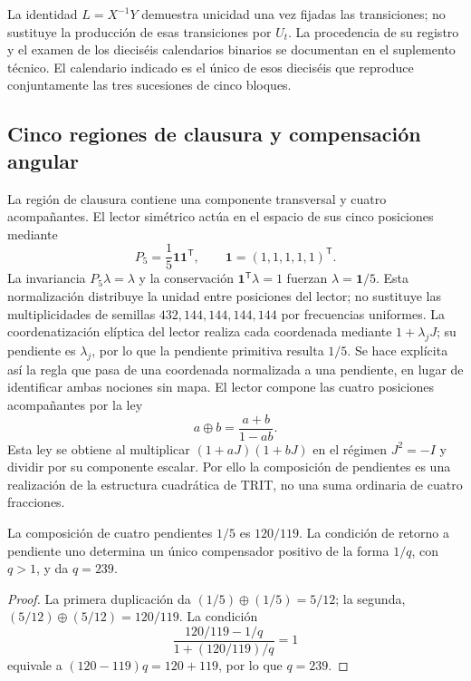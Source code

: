 La identidad \(L=X^{-1}Y\) demuestra unicidad una vez fijadas las transiciones; no sustituye la producción de esas transiciones por \(U_t\). La procedencia de su registro y el examen de los dieciséis calendarios binarios se documentan en el suplemento técnico. El calendario indicado es el único de esos dieciséis que reproduce conjuntamente las tres sucesiones de cinco bloques.

\subsection{Cinco regiones de clausura y compensación angular}

La región de clausura contiene una componente transversal y cuatro acompañantes. El lector simétrico actúa en el espacio de sus cinco posiciones mediante
\[
 P_5=\frac15\mathbf1\mathbf1^{\mathsf T},\qquad
 \mathbf1=(1,1,1,1,1)^{\mathsf T}.
\]
La invariancia \(P_5\lambda=\lambda\) y la conservación \(\mathbf1^{\mathsf T}\lambda=1\) fuerzan \(\lambda=\mathbf1/5\). Esta normalización distribuye la unidad entre posiciones del lector; no sustituye las multiplicidades de semillas \(432,144,144,144,144\) por frecuencias uniformes. La coordenatización elíptica del lector realiza cada coordenada mediante \(1+\lambda_jJ\); su pendiente es \(\lambda_j\), por lo que la pendiente primitiva resulta \(1/5\). Se hace explícita así la regla que pasa de una coordenada normalizada a una pendiente, en lugar de identificar ambas nociones sin mapa. El lector compone las cuatro posiciones acompañantes por la ley
\begin{equation}
 a\oplus b=\frac{a+b}{1-ab}.
 \label{eq:suma-pendientes}
\end{equation}
Esta ley se obtiene al multiplicar \((1+aJ)(1+bJ)\) en el régimen \(J^2=-I\) y dividir por su componente escalar. Por ello la composición de pendientes es una realización de la estructura cuadrática de TRIT, no una suma ordinaria de cuatro fracciones.

\begin{proposition}
La composición de cuatro pendientes \(1/5\) es \(120/119\). La condición de retorno a pendiente uno determina un único compensador positivo de la forma \(1/q\), con \(q>1\), y da \(q=239\).
\end{proposition}
\begin{proof}
La primera duplicación da \((1/5)\oplus(1/5)=5/12\); la segunda, \((5/12)\oplus(5/12)=120/119\). La condición
\[
 \frac{120/119-1/q}{1+(120/119)/q}=1
\]
equivale a \((120-119)q=120+119\), por lo que \(q=239\).
\end{proof}

